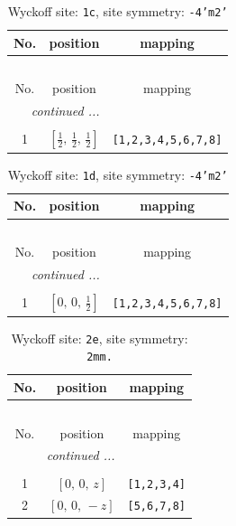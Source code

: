 \documentclass[fleqn,8pt]{jsarticle}
\begin{document}
\begin{longtable}{ccc}
\caption{Wyckoff site: {\tt 1c}, site symmetry: {\tt -4'm2'}}
 \\
 \hline \hline
No. & position & mapping \\ \hline \endfirsthead

\multicolumn{2}{l}{\tablename\ \thetable{}} \\
 \hline \hline
No. & position & mapping \\ \hline \endhead

 \hline \hline
\multicolumn{2}{r}{\footnotesize\it continued ...} \\ \endfoot

 \hline \hline
\multicolumn{2}{r}{} \\ \endlastfoot

1 & $\left[ \frac{1}{2},\, \frac{1}{2},\, \frac{1}{2} \right]$ & {\tt [1,2,3,4,5,6,7,8]} \\
\end{longtable}
\renewcommand{\arraystretch}{1.2}
\begin{longtable}{ccc}
\caption{Wyckoff site: {\tt 1d}, site symmetry: {\tt -4'm2'}}
 \\
 \hline \hline
No. & position & mapping \\ \hline \endfirsthead

\multicolumn{2}{l}{\tablename\ \thetable{}} \\
 \hline \hline
No. & position & mapping \\ \hline \endhead

 \hline \hline
\multicolumn{2}{r}{\footnotesize\it continued ...} \\ \endfoot

 \hline \hline
\multicolumn{2}{r}{} \\ \endlastfoot

1 & $\left[ 0,\, 0,\, \frac{1}{2} \right]$ & {\tt [1,2,3,4,5,6,7,8]} \\
\end{longtable}
\renewcommand{\arraystretch}{1.2}
\begin{longtable}{ccc}
\caption{Wyckoff site: {\tt 2e}, site symmetry: {\tt 2mm.}}
 \\
 \hline \hline
No. & position & mapping \\ \hline \endfirsthead

\multicolumn{2}{l}{\tablename\ \thetable{}} \\
 \hline \hline
No. & position & mapping \\ \hline \endhead

 \hline \hline
\multicolumn{2}{r}{\footnotesize\it continued ...} \\ \endfoot

 \hline \hline
\multicolumn{2}{r}{} \\ \endlastfoot

1 & $\left[ 0,\, 0,\, z \right]$ & {\tt [1,2,3,4]} \\ \hline
2 & $\left[ 0,\, 0,\, - z \right]$ & {\tt [5,6,7,8]} \\
\end{longtable}
\end{document}

